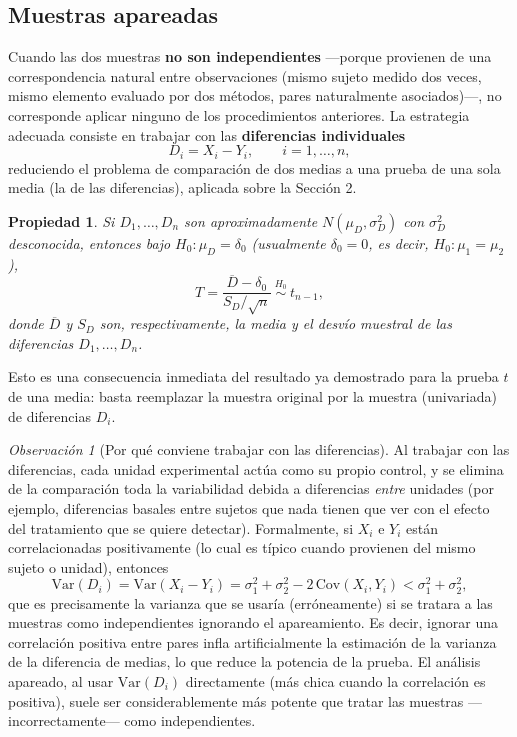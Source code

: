 \documentclass[11pt,a4paper]{article}
\theoremstyle{plain}
\newtheorem{propiedad}[teorema]{Propiedad}
\theoremstyle{definition}
\theoremstyle{remark}
\newtheorem{observacion}[teorema]{Observación}
\begin{document}
\subsection{Muestras apareadas}

Cuando las dos muestras \textbf{no son independientes} —porque provienen de una correspondencia natural entre observaciones (mismo sujeto medido dos veces, mismo elemento evaluado por dos métodos, pares naturalmente asociados)—, no corresponde aplicar ninguno de los procedimientos anteriores. La estrategia adecuada consiste en trabajar con las \textbf{diferencias individuales}
\[
D_i=X_i-Y_i,\qquad i=1,\dots,n,
\]
reduciendo el problema de comparación de dos medias a una prueba de una sola media (la de las diferencias), aplicada sobre la Sección 2.

\begin{propiedad}
Si $D_1,\dots,D_n$ son aproximadamente $N(\mu_D,\sigma_D^2)$ con $\sigma_D^2$ desconocida, entonces bajo $H_0:\mu_D=\delta_0$ (usualmente $\delta_0=0$, es decir, $H_0:\mu_1=\mu_2$),
\[
T=\frac{\overline D-\delta_0}{S_D/\sqrt n}\ \overset{H_0}{\sim}\ t_{n-1},
\]
donde $\overline D$ y $S_D$ son, respectivamente, la media y el desvío muestral de las diferencias $D_1,\dots,D_n$.
\end{propiedad}

Esto es una consecuencia inmediata del resultado ya demostrado para la prueba $t$ de una media: basta reemplazar la muestra original por la muestra (univariada) de diferencias $D_i$.

\begin{observacion}[Por qué conviene trabajar con las diferencias]
Al trabajar con las diferencias, cada unidad experimental actúa como su propio control, y se elimina de la comparación toda la variabilidad debida a diferencias \emph{entre} unidades (por ejemplo, diferencias basales entre sujetos que nada tienen que ver con el efecto del tratamiento que se quiere detectar). Formalmente, si $X_i$ e $Y_i$ están correlacionadas positivamente (lo cual es típico cuando provienen del mismo sujeto o unidad), entonces
\[
\text{Var}(D_i)=\text{Var}(X_i-Y_i)=\sigma_1^2+\sigma_2^2-2\,\text{Cov}(X_i,Y_i) < \sigma_1^2+\sigma_2^2,
\]
que es precisamente la varianza que se usaría (erróneamente) si se tratara a las muestras como independientes ignorando el apareamiento. Es decir, ignorar una correlación positiva entre pares infla artificialmente la estimación de la varianza de la diferencia de medias, lo que reduce la potencia de la prueba. El análisis apareado, al usar $\text{Var}(D_i)$ directamente (más chica cuando la correlación es positiva), suele ser considerablemente más potente que tratar las muestras —incorrectamente— como independientes.
\end{observacion}
\end{document}
